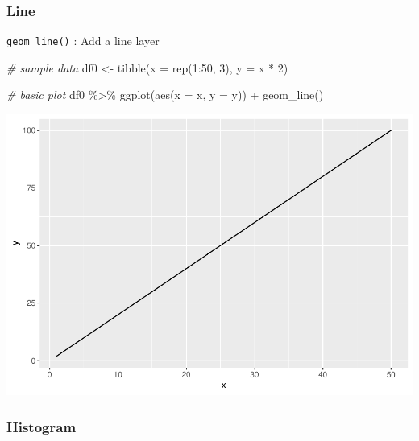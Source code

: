\documentclass[
]{article}
\newenvironment{Shaded}{\begin{snugshade}}{\end{snugshade}}
\newcommand{\AttributeTok}[1]{\textcolor[rgb]{0.77,0.63,0.00}{#1}}
\newcommand{\CommentTok}[1]{\textcolor[rgb]{0.56,0.35,0.01}{\textit{#1}}}
\newcommand{\DecValTok}[1]{\textcolor[rgb]{0.00,0.00,0.81}{#1}}
\newcommand{\FunctionTok}[1]{\textcolor[rgb]{0.00,0.00,0.00}{#1}}
\newcommand{\NormalTok}[1]{#1}
\newcommand{\OtherTok}[1]{\textcolor[rgb]{0.56,0.35,0.01}{#1}}
\newcommand{\SpecialCharTok}[1]{\textcolor[rgb]{0.00,0.00,0.00}{#1}}
\begin{document}
\hypertarget{line}{%
\subsubsection{Line}\label{line}}

\texttt{geom\_line()} : Add a line layer

\begin{Shaded}
\begin{Highlighting}[]
\CommentTok{\# sample data}
\NormalTok{df0 }\OtherTok{\textless{}{-}} \FunctionTok{tibble}\NormalTok{(}\AttributeTok{x =} \FunctionTok{rep}\NormalTok{(}\DecValTok{1}\SpecialCharTok{:}\DecValTok{50}\NormalTok{, }\DecValTok{3}\NormalTok{),}
              \AttributeTok{y =}\NormalTok{ x }\SpecialCharTok{*} \DecValTok{2}\NormalTok{)}

\CommentTok{\# basic plot}
\NormalTok{df0 }\SpecialCharTok{\%\textgreater{}\%} 
  \FunctionTok{ggplot}\NormalTok{(}\FunctionTok{aes}\NormalTok{(}\AttributeTok{x =}\NormalTok{ x,}
             \AttributeTok{y =}\NormalTok{ y)) }\SpecialCharTok{+}
  \FunctionTok{geom\_line}\NormalTok{()}
\end{Highlighting}
\end{Shaded}

\begin{center}\includegraphics{biostats_files/figure-latex/unnamed-chunk-119-1} \end{center}

\hypertarget{histogram}{%
\subsubsection{Histogram}\label{histogram}}
\end{document}
